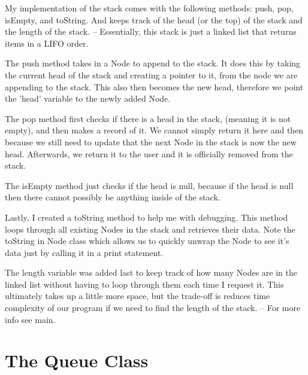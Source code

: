 \documentclass[letterpaper, 10pt,DIV=13]{scrartcl}
\numberwithin{equation}{section} %
\numberwithin{figure}{section} %
\numberwithin{table}{section} %
\begin{document}
My implementation of the stack comes with the following methods: push, pop, isEmpty, and toString. And keeps track of the head (or the top) of the stack and the length of the stack.
-- Essentially, this stack is just a linked list that returns items in a LIFO order.

The push method takes in a Node to append to the stack. It does this by taking the current head of the stack and creating a pointer to it, from the node we are appending to the stack. This also then becomes the new head, therefore we point the 'head' variable to the newly added Node.

The pop method first checks if there is a head in the stack, (meaning it is not empty), and then makes a record of it. We cannot simply return it here and then because we still need to update that the next Node in the stack is now the new head. Afterwards, we return it to the user and it is officially removed from the stack.

The isEmpty method just checks if the head is null, because if the head is null then there cannot possibly be anything inside of the stack.

Lastly, I created a toString method to help me with debugging. This method loops through all existing Nodes in the stack and retrieves their data. Note the toString in Node class which allows us to quickly unwrap the Node to see it's data just by calling it in a print statement.

The length variable was added last to keep track of how many Nodes are in the linked list without having to loop through them each time I request it. This ultimately takes up a little more space, but the trade-off is reduces time complexity of our program if we need to find the length of the stack.
-- For more info see main.


\section{The Queue Class}
\end{document}
